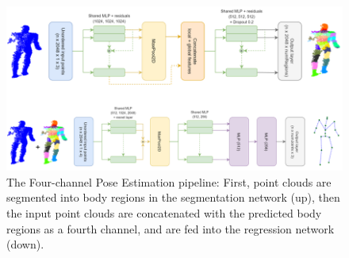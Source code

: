 \vspace{5mm}
\begin{figure}[H]
\begin{center}
  \includegraphics[width=\textwidth]{images/implementation/4chan_pipeline.png}
  \caption[The Four-channel Pose Estimation pipeline.]{ The Four-channel Pose Estimation pipeline: First, point clouds are segmented into body regions in the segmentation network (up), then the input point clouds are concatenated with the predicted body regions as a fourth channel, and are fed into the regression network (down).}
  \label{fig:4chan_pipeline}
\end{center}
\end{figure}



